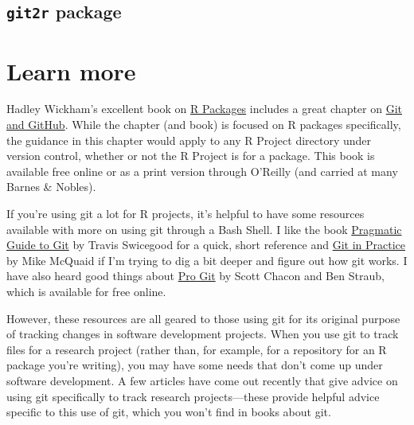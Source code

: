 \documentclass[]{tufte-book}
\begin{document}
\hypertarget{git2r-package}{%
\subsection{\texorpdfstring{\texttt{git2r} package}{git2r package}}\label{git2r-package}}

\hypertarget{learn-more-1}{%
\section{Learn more}\label{learn-more-1}}

Hadley Wickham's excellent book on \href{http://r-pkgs.had.co.nz/}{R Packages} includes a great
chapter on \href{http://r-pkgs.had.co.nz/git.html}{Git and GitHub}. While the chapter (and book) is
focused on R packages specifically, the guidance in this chapter would apply to any
R Project directory under version control, whether or not the R Project is for a package.
This book is available free online or as a print version through O'Reilly (and
carried at many Barnes \& Nobles).

If you're using git a lot for R projects, it's helpful to have some resources available with
more on using git through a Bash Shell. I like the book \href{https://www.amazon.com/Pragmatic-Guide-Git-Programmers/dp/1934356727/ref=sr_1_28?keywords=git\&qid=1554173700\&s=gateway\&sr=8-28}{Pragmatic Guide to Git} by Travis Swicegood for a quick, short reference and
\href{https://www.amazon.com/Git-Practice-Techniques-Mike-McQuaid/dp/1617291978/ref=sr_1_60?keywords=git\&qid=1554174811\&s=gateway\&sr=8-60}{Git in Practice} by Mike McQuaid if I'm trying to dig a bit deeper
and figure out how git works.
I have also heard good things about \href{https://git-scm.com/book/en/v2}{Pro Git} by Scott Chacon and
Ben Straub, which is available for free online.

However, these resources are all geared to those using git for its original purpose of
tracking changes in software development projects. When you use git to track files for a research
project (rather than, for example, for a repository for an R package you're writing), you
may have some needs that don't come up under software development. A few articles have come
out recently that give advice on using git specifically to track research projects---these provide
helpful advice specific to this use of git, which you won't find in books about git.
\end{document}
